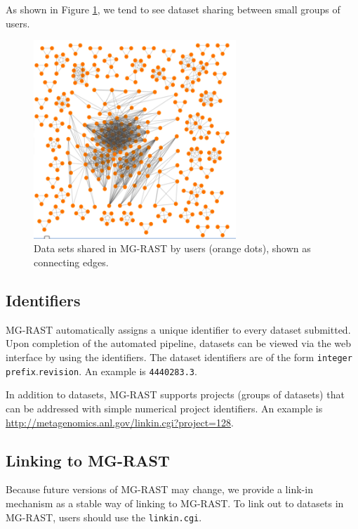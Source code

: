 \documentclass[12pt,fullpage]{report}
\begin{document}
As shown in Figure \ref{fig:Data-sharing-in-mg-rast}, we tend to see dataset sharing between small groups of users.

\begin{figure}
\begin{center}
\includegraphics[width=3in]{Images/Data-sharing-in-mg-rast}
\end{center}
\caption{
Data sets shared in MG-RAST by users (orange dots), shown as connecting edges.
}
\label{fig:Data-sharing-in-mg-rast}
\end{figure}

\subsection{Identifiers}
\label{section:identifier}
MG-RAST automatically assigns a unique identifier to every dataset submitted. Upon completion of the automated pipeline, datasets can be viewed via the web interface by using the identifiers.
The dataset identifiers are of the form \texttt{integer prefix}.\texttt{revision}. An example is \texttt{4440283.3}.

In addition to datasets, MG-RAST supports projects (groups of datasets) that can be addressed with simple numerical project identifiers.
An example is
\url{http://metagenomics.anl.gov/linkin.cgi?project=128}.

\subsection{Linking to MG-RAST}
Because future versions of MG-RAST may change, we provide a link-in mechanism as a stable way of linking to MG-RAST. To link out to datasets in MG-RAST, users should use the \texttt{linkin.cgi}.
\end{document}

